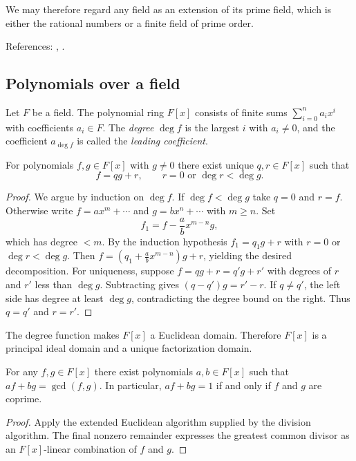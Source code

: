 \begin{remark}
We may therefore regard any field as an extension of its prime field, which is either the rational numbers or a finite field of prime order.
\end{remark}

References: \cite[\S13]{DF}, \cite[Ch.~I]{Artin}.

\subsection{Polynomials over a field}
\begin{definition}
Let $F$ be a field. The polynomial ring $F[x]$ consists of finite sums $\sum_{i=0}^n a_i x^i$ with coefficients $a_i\in F$. The \emph{degree} $\deg f$ is the largest $i$ with $a_i\ne0$, and the coefficient $a_{\deg f}$ is called the \emph{leading coefficient}.
\end{definition}

\begin{proposition}\label{prop:division}
For polynomials $f,g\in F[x]$ with $g\ne0$ there exist unique $q,r\in F[x]$ such that
\[
f=qg+r, \qquad r=0\text{ or }\deg r<\deg g.
\]
\end{proposition}
\begin{proof}
We argue by induction on $\deg f$. If $\deg f<\deg g$ take $q=0$ and $r=f$. Otherwise write $f=a x^m+\cdots$ and $g=b x^n+\cdots$ with $m\ge n$. Set
\[
f_1=f-\frac{a}{b}x^{m-n}g,
\]
which has degree $<m$. By the induction hypothesis $f_1=q_1g+r$ with $r=0$ or $\deg r<\deg g$. Then $f=(q_1+\frac{a}{b}x^{m-n})g+r$, yielding the desired decomposition. For uniqueness, suppose $f=qg+r=q' g+r'$ with degrees of $r$ and $r'$ less than $\deg g$. Subtracting gives $(q-q')g=r'-r$. If $q\ne q'$, the left side has degree at least $\deg g$, contradicting the degree bound on the right. Thus $q=q'$ and $r=r'$.
\end{proof}

\begin{corollary}
The degree function makes $F[x]$ a Euclidean domain. Therefore $F[x]$ is a principal ideal domain and a unique factorization domain.
\end{corollary}

\begin{corollary}\label{cor:bezout}
For any $f,g\in F[x]$ there exist polynomials $a,b\in F[x]$ such that $af+bg=\gcd(f,g)$. In particular, $af+bg=1$ if and only if $f$ and $g$ are coprime.
\end{corollary}
\begin{proof}
Apply the extended Euclidean algorithm supplied by the division algorithm. The final nonzero remainder expresses the greatest common divisor as an $F[x]$-linear combination of $f$ and $g$.
\end{proof}

